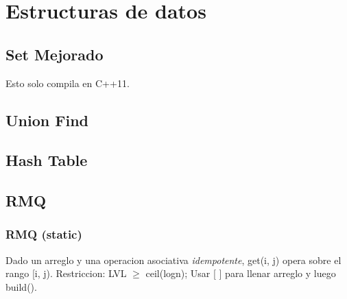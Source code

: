 \section{Estructuras de datos}

\subsection{Set Mejorado}
Esto solo compila en C++11.


\subsection{Union Find}
% 
% 


\subsection{Hash Table}


\subsection{RMQ}
\subsubsection{RMQ (static)}
Dado un arreglo y una operacion asociativa \emph{idempotente}, get(i, j) opera sobre el rango [i, j). Restriccion: LVL $\ge$ ceil(logn); Usar [ ] para llenar arreglo y luego build().

